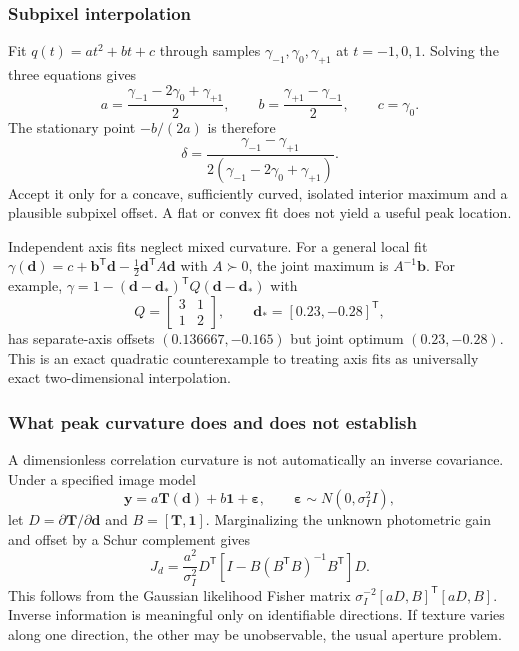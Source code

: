 \subsubsection{Subpixel interpolation}

Fit $q(t)=a t^2+b t+c$ through samples $\gamma_{-1},\gamma_0,
\gamma_{+1}$ at $t=-1,0,1$. Solving the three equations gives
\begin{equation}
 a=\frac{\gamma_{-1}-2\gamma_0+\gamma_{+1}}2,
 \qquad b=\frac{\gamma_{+1}-\gamma_{-1}}2,
 \qquad c=\gamma_0.
\end{equation}
The stationary point $-b/(2a)$ is therefore
\begin{equation}
 \delta=\frac{\gamma_{-1}-\gamma_{+1}}
          {2(\gamma_{-1}-2\gamma_0+\gamma_{+1})}.
\end{equation}
Accept it only for a concave, sufficiently curved, isolated interior
maximum and a plausible subpixel offset. A flat or convex fit does not
yield a useful peak location.

Independent axis fits neglect mixed curvature. For a general local fit
$\gamma(\boldsymbol d)=c+\boldsymbol b^{\mathsf T}\boldsymbol d
-\tfrac12\boldsymbol d^{\mathsf T}A\boldsymbol d$ with $A\succ0$,
the joint maximum is $A^{-1}\boldsymbol b$. For example,
$\gamma=1-(\boldsymbol d-\boldsymbol d_*)^{\mathsf T}
Q(\boldsymbol d-\boldsymbol d_*)$ with
\begin{equation}
 Q=\begin{bmatrix}3&1\\1&2\end{bmatrix},\qquad
 \boldsymbol d_*=[0.23,-0.28]^{\mathsf T},
\end{equation}
has separate-axis offsets $(0.136667,-0.165)$ but joint optimum
$(0.23,-0.28)$. This is an exact quadratic counterexample to treating
axis fits as universally exact two-dimensional interpolation.

\subsubsection{What peak curvature does and does not establish}

A dimensionless correlation curvature is not automatically an inverse
covariance. Under a specified image model
\begin{equation}
 \boldsymbol y=a\boldsymbol T(\boldsymbol d)+b\boldsymbol 1
                  +\boldsymbol\varepsilon,
 \qquad\boldsymbol\varepsilon\sim N(0,\sigma_I^2 I),
\end{equation}
let $D=\partial\boldsymbol T/\partial\boldsymbol d$ and
$B=[\boldsymbol T,\boldsymbol1]$. Marginalizing the unknown photometric
gain and offset by a Schur complement gives
\begin{equation}
 J_d=\frac{a^2}{\sigma_I^2}D^{\mathsf T}
 \left[I-B(B^{\mathsf T}B)^{-1}B^{\mathsf T}\right]D.
 \label{eq:photometric-fisher}
\end{equation}
This follows from the Gaussian likelihood Fisher matrix
$\sigma_I^{-2}[aD,B]^{\mathsf T}[aD,B]$. Inverse information is meaningful
only on identifiable directions. If texture varies along one direction,
the other may be unobservable, the usual aperture problem.

